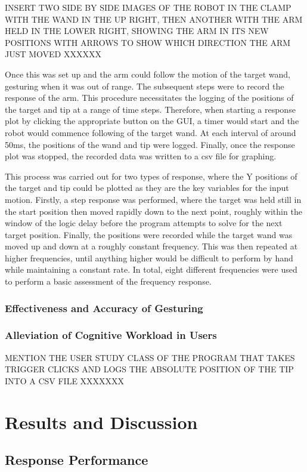 \documentclass[11pt]{article}
\begin{document}
INSERT TWO SIDE BY SIDE IMAGES OF THE ROBOT IN THE CLAMP WITH THE WAND IN THE UP RIGHT, THEN ANOTHER WITH THE ARM HELD IN THE LOWER RIGHT, SHOWING THE ARM IN ITS NEW POSITIONS WITH ARROWS TO SHOW WHICH DIRECTION THE ARM JUST MOVED XXXXXX

Once this was set up and the arm could follow the motion of the target wand, gesturing when it was out of range. The subsequent steps were to record the response of the arm. This procedure necessitates the logging of the positions of the target and tip at a range of time steps. Therefore, when starting a response plot by clicking the appropriate button on the GUI, a timer would start and the robot would commence following of the target wand. At each interval of around 50ms, the positions of the wand and tip were logged. Finally, once the response plot was stopped, the recorded data was written to a csv file for graphing. 

This process was carried out for two types of response, where the Y positions of the target and tip could be plotted as they are the key variables for the input motion. Firstly, a step response was performed, where the target was held still in the start position then moved rapidly down to the next point, roughly within the window of the logic delay before the program attempts to solve for the next target position. Finally, the positions were recorded while the target wand was moved up and down at a roughly constant frequency. This was then repeated at higher frequencies, until anything higher would be difficult to perform by hand while maintaining a constant rate. In total, eight different frequencies were used to perform a basic assessment of the frequency response.


\subsubsection{Effectiveness and Accuracy of Gesturing}
\subsubsection{Alleviation of Cognitive Workload in Users}
MENTION THE USER STUDY CLASS OF THE PROGRAM THAT TAKES TRIGGER CLICKS AND LOGS THE ABSOLUTE POSITION OF THE TIP INTO A CSV FILE XXXXXXX

\pagebreak
\section{Results and Discussion}
\subsection{Response Performance}
\end{document}
